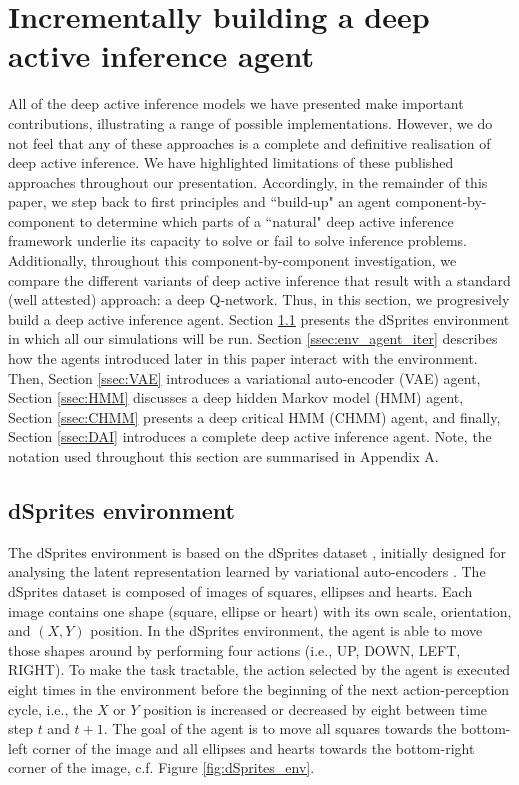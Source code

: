 \documentclass[twoside,11pt]{article}
\begin{document}
\section{Incrementally building a deep active inference agent} \label{sec:build_dai}

All of the deep active inference models we have presented make important contributions, illustrating a range of possible implementations. However, we do not feel that any of these approaches is a complete and definitive realisation of deep active inference. We have highlighted limitations of these published approaches throughout our presentation. Accordingly, in the remainder of this paper, we step back to first principles and ``build-up" an agent component-by-component to determine which parts of a ``natural" deep active inference framework underlie its capacity to solve or fail to solve inference problems. Additionally, throughout this component-by-component investigation, we compare the different variants of deep active inference that result with a standard (well attested) approach: a deep Q-network. Thus, in this section, we progresively build a deep active inference agent. Section \ref{ssec:dSprites_env} presents the dSprites environment in which all our simulations will be run. Section \ref{ssec:env_agent_iter} describes how the agents introduced later in this paper interact with the environment. Then, Section \ref{ssec:VAE} introduces a variational auto-encoder (VAE) agent, Section \ref{ssec:HMM} discusses a deep hidden Markov model (HMM) agent, Section \ref{ssec:CHMM} presents a deep critical HMM (CHMM) agent, and finally, Section \ref{ssec:DAI} introduces a complete deep active inference agent. Note, the notation used throughout this section are summarised in Appendix A.

\subsection{dSprites environment} \label{ssec:dSprites_env}

The dSprites environment is based on the dSprites dataset \citep{dsprites17}, initially designed for analysing the latent representation learned by variational auto-encoders \citep{VAE}. The dSprites dataset is composed of images of squares, ellipses and hearts. Each image contains one shape (square, ellipse or heart) with its own scale, orientation, and $(X,Y)$ position. In the dSprites environment, the agent is able to move those shapes around by performing four actions (i.e., UP, DOWN, LEFT, RIGHT). To make the task tractable, the action selected by the agent is executed eight times in the environment before the beginning of the next action-perception cycle, i.e., the $X$ or $Y$ position is increased or decreased by eight between time step $t$ and $t+1$. The goal of the agent is to move all squares towards the bottom-left corner of the image and all ellipses and hearts towards the bottom-right corner of the image, c.f. Figure \ref{fig:dSprites_env}.
\end{document}
